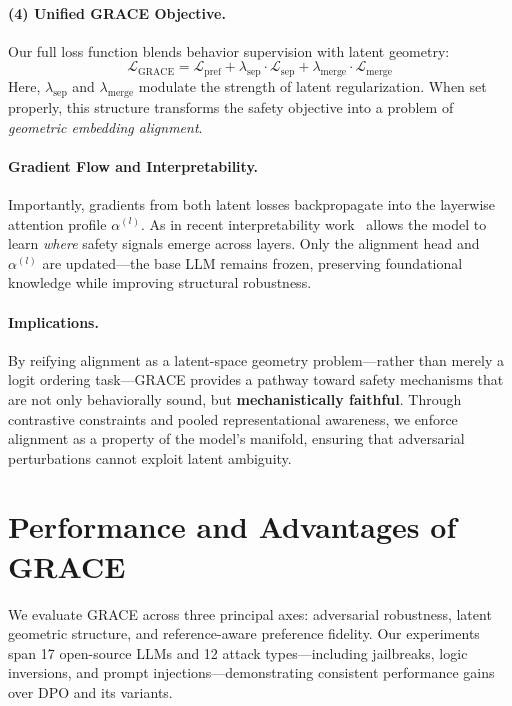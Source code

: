 \paragraph{(4) Unified GRACE Objective.}
Our full loss function blends behavior supervision with latent geometry:
\[
\mathcal{L}_{\mathrm{GRACE}} = \mathcal{L}_{\mathrm{pref}} + \lambda_{\mathrm{sep}} \cdot \mathcal{L}_{\mathrm{sep}} + \lambda_{\mathrm{merge}} \cdot \mathcal{L}_{\mathrm{merge}}
\]
Here, \( \lambda_{\mathrm{sep}} \) and \( \lambda_{\mathrm{merge}} \) modulate the strength of latent regularization. When set properly, this structure transforms the safety objective into a problem of \emph{geometric embedding alignment}.

\paragraph{Gradient Flow and Interpretability.}
Importantly, gradients from both latent losses backpropagate into the layerwise attention profile \( \alpha^{(l)} \). As in recent interpretability work~\cite{belrose2023language, mu2023layers} allows the model to learn \textit{where} safety signals emerge across layers. Only the alignment head and \( \alpha^{(l)} \) are updated—the base LLM remains frozen, preserving foundational knowledge while improving structural robustness.

\paragraph{Implications.}
By reifying alignment as a latent-space geometry problem—rather than merely a logit ordering task—GRACE provides a pathway toward safety mechanisms that are not only behaviorally sound, but \textbf{mechanistically faithful}. Through contrastive constraints and pooled representational awareness, we enforce alignment as a property of the model’s manifold, ensuring that adversarial perturbations cannot exploit latent ambiguity.





\section{Performance and Advantages of \textsc{GRACE}}
\label{sec:appendix_performance}

We evaluate \textsc{GRACE} across three principal axes: adversarial robustness, latent geometric structure, and reference-aware preference fidelity. Our experiments span 17 open-source LLMs and 12 attack types—including jailbreaks, logic inversions, and prompt injections—demonstrating consistent performance gains over DPO and its variants.

